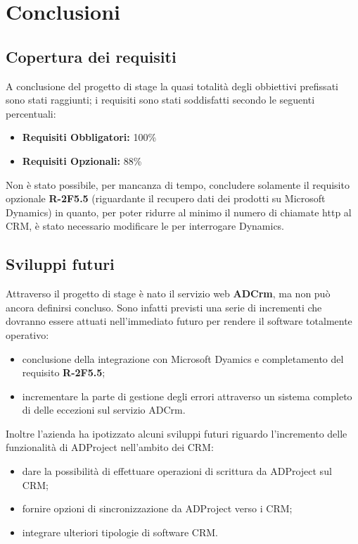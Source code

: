 \documentclass[12pt,a4paper,twoside,openany,english]{book}
\begin{document}
\chapter{Conclusioni}\label{conclusioni}
\section{Copertura dei requisiti}
A conclusione del progetto di stage la quasi totalità degli obbiettivi prefissati sono stati raggiunti; i requisiti sono stati soddisfatti secondo le seguenti percentuali:
\begin{itemize}
	\item \textbf{Requisiti Obbligatori:} 100\%
	\item \textbf{Requisiti Opzionali:} 88\%
\end{itemize}
Non è stato possibile, per mancanza di tempo, concludere solamente il requisito opzionale \textbf{R-2F5.5} (riguardante il recupero dati dei prodotti su Microsoft Dynamics) in quanto, per poter ridurre al minimo il numero di chiamate \gls{http} al \gls{CRM}, è stato necessario modificare le  per interrogare Dynamics.
\section{Sviluppi futuri}
Attraverso il progetto di stage è nato il servizio web \textbf{ADCrm}, ma non può ancora definirsi concluso. Sono infatti previsti una serie di incrementi che dovranno essere attuati nell'immediato futuro per rendere il software totalmente operativo:
\begin{itemize}
	\item conclusione della integrazione con Microsoft Dyamics e completamento del requisito \textbf{R-2F5.5};
	\item incrementare la parte di gestione degli errori attraverso un sistema completo di  delle eccezioni sul servizio ADCrm.
\end{itemize}
Inoltre l'azienda ha ipotizzato alcuni sviluppi futuri riguardo l'incremento delle funzionalità di ADProject nell'ambito dei \gls{CRM}:
\begin{itemize}
	\item dare la possibilità di effettuare operazioni di scrittura da ADProject sul \gls{CRM};
	\item fornire opzioni di sincronizzazione da ADProject verso i \gls{CRM};
	\item integrare ulteriori tipologie di software \gls{CRM}.
\end{itemize}
\newpage
\end{document}
